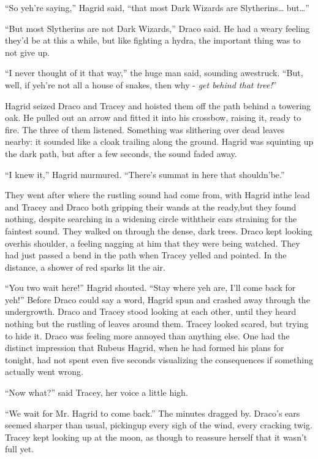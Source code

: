 ``So yeh're saying,'' Hagrid said, ``that most Dark Wizards are Slytherins\ldots{} but\ldots{}''

``But most Slytherins are not Dark Wizards,'' Draco said. He had a weary feeling they'd be at this a while, but like fighting a hydra, the important thing was to not give up.

``I never thought of it that way,'' the huge man said, sounding awestruck. ``But, well, if yeh're not all a house of snakes, then why - \emph{get behind that tree!}''

Hagrid seized Draco and Tracey and hoisted them off the path behind a towering oak. He pulled out an arrow and fitted it into his crossbow, raising it, ready to fire. The three of them listened. Something was slithering over dead leaves nearby: it sounded like a cloak trailing along the ground. Hagrid was squinting up the dark path, but after a few seconds, the sound faded away.

``I knew it,'' Hagrid murmured. ``There's summat in here that shouldn'be.''

They went after where the rustling sound had come from, with Hagrid inthe lead and Tracey and Draco both gripping their wands at the ready,but they found nothing, despite searching in a widening circle withtheir ears straining for the faintest sound.
They walked on through the dense, dark trees. Draco kept looking overhis shoulder, a feeling nagging at him that they were being watched. They had just passed a bend in the path when Tracey yelled and pointed.
In the distance, a shower of red sparks lit the air.

``You two wait here!'' Hagrid shouted. ``Stay where yeh are, I'll come back for yeh!''
Before Draco could say a word, Hagrid spun and crashed away through the undergrowth.
Draco and Tracey stood looking at each other, until they heard nothing but the rustling of leaves around them. Tracey looked scared, but trying to hide it. Draco was feeling more annoyed than anything else. One had the distinct impression that Rubeus Hagrid, when he had formed his plans for tonight, had not spent even five seconds visualizing the consequences if something actually went wrong.

``Now what?'' said Tracey, her voice a little high.

``We wait for Mr. Hagrid to come back.''
The minutes dragged by. Draco's ears seemed sharper than usual, pickingup every sigh of the wind, every cracking twig. Tracey kept looking up at the moon, as though to reassure herself that it wasn't full yet.

